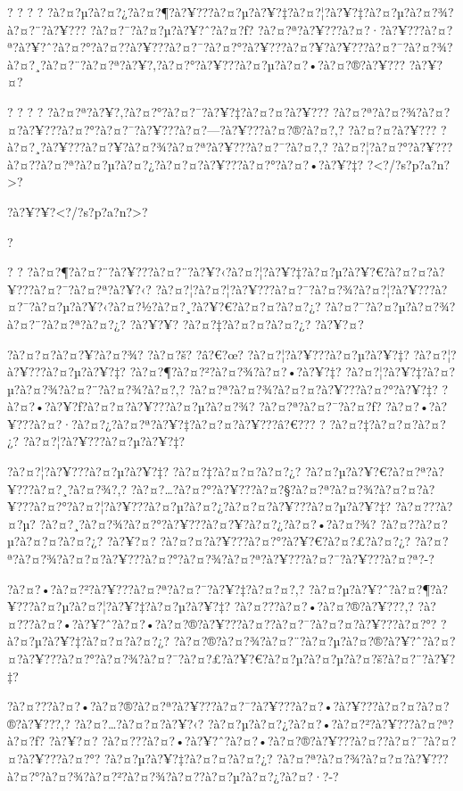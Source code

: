 \documentclass[11pt, openany]{book}
\begin{document}
{{{{{{{{{{{? ? ? ?
?à?¤?µ?à?¤?¿?à?¤?¶?à?¥???à?¤?µ?à?¥?‡?à?¤?¦?à?¥?‡?à?¤?µ?à?¤?¾?à?¤?¨?à?¥???
?à?¤?¯?à?¤?µ?à?¥?ˆ?à?¤?ƒ?
?à?¤?ª?à?¥???à?¤?·?à?¥???à?¤?ª?à?¥?ˆ?à?¤?°?à?¤?­?à?¥???à?¤?¯?à?¤?°?à?¥???à?¤?¥?à?¥???à?¤?¯?à?¤?¾?à?¤?¸?à?¤?¨?à?¤?ª?à?¥?‚?à?¤?°?à?¥???à?¤?µ?à?¤?•?à?¤?®?à?¥???
?à?¥?¤?

? ? ? ? ?à?¤?ª?à?¥?‚?à?¤?°?à?¤?¯?à?¥?‡?à?¤?¤?à?¥???
?à?¤?ª?à?¤?¾?à?¤?¤?à?¥???à?¤?°?à?¤?¯?à?¥???à?¤?---?à?¥???à?¤?®?à?¤?‚?
?à?¤?¤?à?¥??? ?à?¤?¸?à?¥???à?¤?¥?à?¤?¾?à?¤?ª?à?¥???à?¤?¯?à?¤?‚?
?à?¤?¦?à?¤?°?à?¥???à?¤?­?à?¤?ª?à?¤?µ?à?¤?¿?à?¤?¤?à?¥???à?¤?°?à?¤?•?à?¥?‡?
?\textless{}?/?s?p?a?n?\textgreater{}?

?à?¥?¥?\textless{}?/?s?p?a?n?\textgreater{}?

?

? ?
?à?¤?¶?à?¤?¨?à?¥???à?¤?¨?à?¥?‹?à?¤?¦?à?¥?‡?à?¤?µ?à?¥?€?à?¤?¤?à?¥???à?¤?¯?à?¤?ª?à?¥?‹?
?à?¤?¦?à?¤?¦?à?¥???à?¤?¯?à?¤?¾?à?¤?¦?à?¥???à?¤?¯?à?¤?µ?à?¥?‹?à?¤?½?à?¤?¸?à?¥?€?à?¤?¤?à?¤?¿?
?à?¤?¯?à?¤?µ?à?¤?¾?à?¤?¨?à?¤?ª?à?¤?¿? ?à?¥?¥? ?à?¤?‡?à?¤?¤?à?¤?¿?
?à?¥?¤?

?à?¤?¤?à?¤?¥?à?¤?¾? ?à?¤?š? ?â?€?œ? ?à?¤?¦?à?¥???à?¤?µ?à?¥?‡?
?à?¤?¦?à?¥???à?¤?µ?à?¥?‡? ?à?¤?¶?à?¤?²?à?¤?¾?à?¤?•?à?¥?‡?
?à?¤?¦?à?¥?‡?à?¤?µ?à?¤?¾?à?¤?¨?à?¤?¾?à?¤?‚?
?à?¤?ª?à?¤?¾?à?¤?¤?à?¥???à?¤?°?à?¥?‡?
?à?¤?•?à?¥?ƒ?à?¤?¤?à?¥???à?¤?µ?à?¤?¾? ?à?¤?ª?à?¤?¯?à?¤?ƒ?
?à?¤?•?à?¥???à?¤?·?à?¤?¿?à?¤?ª?à?¥?‡?à?¤?¤?à?¥???â?€??? ?
?à?¤?‡?à?¤?¤?à?¤?¿? ?à?¤?¦?à?¥???à?¤?µ?à?¥?‡?

?à?¤?¦?à?¥???à?¤?µ?à?¥?‡? ?à?¤?‡?à?¤?¤?à?¤?¿?
?à?¤?µ?à?¥?€?à?¤?ª?à?¥???à?¤?¸?à?¤?¾?,?
?à?¤?\ldots{}?à?¤?°?à?¥???à?¤?§?à?¤?ª?à?¤?¾?à?¤?¤?à?¥???à?¤?°?à?¤?¦?à?¥???à?¤?µ?à?¤?¿?à?¤?¤?à?¥???à?¤?µ?à?¥?‡?
?à?¤???à?¤?µ? ?à?¤?¸?à?¤?¾?à?¤?°?à?¥???à?¤?¥?à?¤?¿?à?¤?•?à?¤?¾?
?à?¤?­?à?¤?µ?à?¤?¤?à?¤?¿? ?à?¥?¤? ?à?¤?¤?à?¥???à?¤?°?à?¥?€?à?¤?£?à?¤?¿?
?à?¤?ª?à?¤?¾?à?¤?¤?à?¥???à?¤?°?à?¤?¾?à?¤?ª?à?¥???à?¤?¯?à?¥???à?¤?ª?-?

?à?¤?•?à?¤?²?à?¥???à?¤?ª?à?¤?¯?à?¥?‡?à?¤?¤?,?
?à?¤?µ?à?¥?ˆ?à?¤?¶?à?¥???à?¤?µ?à?¤?¦?à?¥?‡?à?¤?µ?à?¥?‡?
?à?¤???à?¤?•?à?¤?®?à?¥???,?
?à?¤???à?¤?•?à?¥?ˆ?à?¤?•?à?¤?®?à?¥???à?¤?­?à?¤?¯?à?¤?¤?à?¥???à?¤?°?
?à?¤?µ?à?¥?‡?à?¤?¤?à?¤?¿?
?à?¤?®?à?¤?¾?à?¤?¨?à?¤?µ?à?¤?®?à?¥?ˆ?à?¤?¤?à?¥???à?¤?°?à?¤?¾?à?¤?¯?à?¤?£?à?¥?€?à?¤?µ?à?¤?µ?à?¤?š?à?¤?¨?à?¥?‡?

?à?¤???à?¤?•?à?¤?®?à?¤?ª?à?¥???à?¤?¯?à?¥???à?¤?•?à?¥???à?¤?¤?à?¤?®?à?¥???,?
?à?¤?\ldots{}?à?¤?¤?à?¥?‹? ?à?¤?µ?à?¤?¿?à?¤?•?à?¤?²?à?¥???à?¤?ª?à?¤?ƒ?
?à?¥?¤?
?à?¤???à?¤?•?à?¥?ˆ?à?¤?•?à?¤?®?à?¥???à?¤?­?à?¤?¯?à?¤?¤?à?¥???à?¤?°?
?à?¤?µ?à?¥?‡?à?¤?¤?à?¤?¿?
?à?¤?ª?à?¤?¾?à?¤?¤?à?¥???à?¤?°?à?¤?¾?à?¤?²?à?¤?¾?à?¤?­?à?¤?µ?à?¤?¿?à?¤?·?-?

}}}}}}}}}}}
\end{document}
